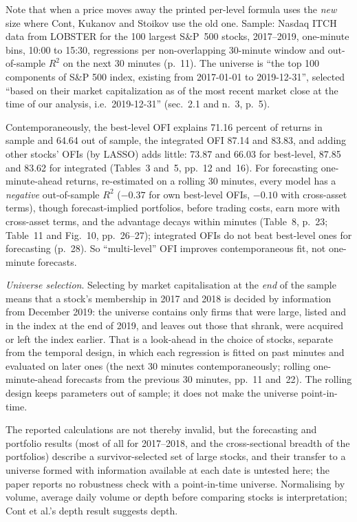 \begin{qfdefinition}
Note that when a price moves away the printed per-level formula uses the \emph{new} size where Cont, Kukanov and Stoikov use the old one. Sample: Nasdaq ITCH data from LOBSTER for the 100 largest S\&P~500 stocks, 2017--2019, one-minute bins, 10:00 to 15:30, regressions per non-overlapping 30-minute window and out-of-sample $R^2$ on the next 30 minutes (p.~11). The universe is ``the top 100 components of S\&P 500 index, existing from 2017-01-01 to 2019-12-31'', selected ``based on their market capitalization as of the most recent market close at the time of our analysis, i.e.\ 2019-12-31'' (sec.~2.1 and n.~3, p.~5).

Contemporaneously, the best-level OFI explains 71.16 percent of returns in sample and 64.64 out of sample, the integrated OFI 87.14 and 83.83, and adding other stocks' OFIs (by LASSO) adds little: 73.87 and 66.03 for best-level, 87.85 and 83.62 for integrated (Tables~3 and~5, pp.~12 and~16). For forecasting one-minute-ahead returns, re-estimated on a rolling 30 minutes, every model has a \emph{negative} out-of-sample $R^2$ ($-0.37$ for own best-level OFIs, $-0.10$ with cross-asset terms), though forecast-implied portfolios, before trading costs, earn more with cross-asset terms, and the advantage decays within minutes (Table~8, p.~23; Table~11 and Fig.~10, pp.~26--27); integrated OFIs do not beat best-level ones for forecasting (p.~28). So ``multi-level'' OFI improves contemporaneous fit, not one-minute forecasts.

\emph{Universe selection}. Selecting by market capitalisation at the \emph{end} of the sample means that a stock's membership in 2017 and 2018 is decided by information from December 2019: the universe contains only firms that were large, listed and in the index at the end of 2019, and leaves out those that shrank, were acquired or left the index earlier. That is a look-ahead in the choice of stocks, separate from the temporal design, in which each regression is fitted on past minutes and evaluated on later ones (the next 30 minutes contemporaneously; rolling one-minute-ahead forecasts from the previous 30 minutes, pp.~11 and~22). The rolling design keeps parameters out of sample; it does not make the universe point-in-time.

The reported calculations are not thereby invalid, but the forecasting and portfolio results (most of all for 2017--2018, and the cross-sectional breadth of the portfolios) describe a survivor-selected set of large stocks, and their transfer to a universe formed with information available at each date is untested here; the paper reports no robustness check with a point-in-time universe. Normalising by volume, average daily volume or depth before comparing stocks is interpretation; Cont et al.'s depth result suggests depth.


\end{qfdefinition}
